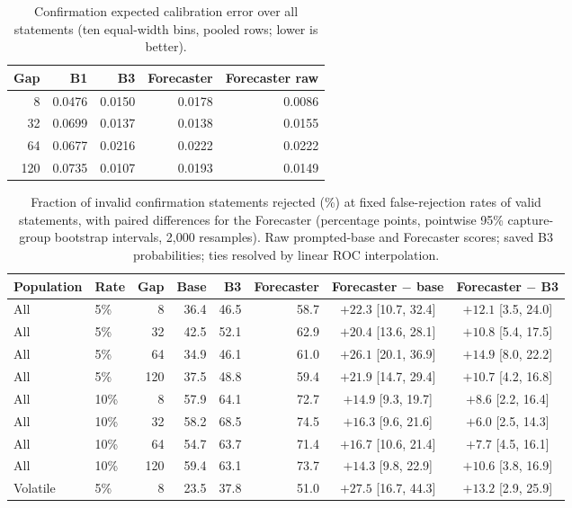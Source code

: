 \documentclass[10pt]{article}
\begin{document}
\begin{table}[h]
\centering
\caption{Confirmation expected calibration error over all statements (ten equal-width bins, pooled rows; lower is better).}
\label{tab:ece}
\begin{tabular}{rrrrr}
\toprule
Gap & B1 & B3 & Forecaster & Forecaster raw \\
\midrule
8 & 0.0476 & 0.0150 & 0.0178 & 0.0086 \\
32 & 0.0699 & 0.0137 & 0.0138 & 0.0155 \\
64 & 0.0677 & 0.0216 & 0.0222 & 0.0222 \\
120 & 0.0735 & 0.0107 & 0.0193 & 0.0149 \\
\bottomrule
\end{tabular}
\end{table}


\begin{table}[h]
\centering
\caption{Fraction of invalid confirmation statements rejected (\%) at fixed false-rejection rates of valid statements, with paired differences for the Forecaster (percentage points, pointwise 95\% capture-group bootstrap intervals, 2,000 resamples). Raw prompted-base and Forecaster scores; saved B3 probabilities; ties resolved by linear ROC interpolation.}
\label{tab:recall}
\small
\begin{tabular}{llrrrrcc}
\toprule
Population & Rate & Gap & Base & B3 & Forecaster & Forecaster $-$ base & Forecaster $-$ B3 \\
\midrule
All & 5\% & 8 & 36.4 & 46.5 & 58.7 & $+22.3$ [10.7, 32.4] & $+12.1$ [3.5, 24.0] \\
All & 5\% & 32 & 42.5 & 52.1 & 62.9 & $+20.4$ [13.6, 28.1] & $+10.8$ [5.4, 17.5] \\
All & 5\% & 64 & 34.9 & 46.1 & 61.0 & $+26.1$ [20.1, 36.9] & $+14.9$ [8.0, 22.2] \\
All & 5\% & 120 & 37.5 & 48.8 & 59.4 & $+21.9$ [14.7, 29.4] & $+10.7$ [4.2, 16.8] \\
\midrule
All & 10\% & 8 & 57.9 & 64.1 & 72.7 & $+14.9$ [9.3, 19.7] & $+8.6$ [2.2, 16.4] \\
All & 10\% & 32 & 58.2 & 68.5 & 74.5 & $+16.3$ [9.6, 21.6] & $+6.0$ [2.5, 14.3] \\
All & 10\% & 64 & 54.7 & 63.7 & 71.4 & $+16.7$ [10.6, 21.4] & $+7.7$ [4.5, 16.1] \\
All & 10\% & 120 & 59.4 & 63.1 & 73.7 & $+14.3$ [9.8, 22.9] & $+10.6$ [3.8, 16.9] \\
\midrule
Volatile & 5\% & 8 & 23.5 & 37.8 & 51.0 & $+27.5$ [16.7, 44.3] & $+13.2$ [2.9, 25.9] \\

\end{tabular}
\end{table}
\end{document}
